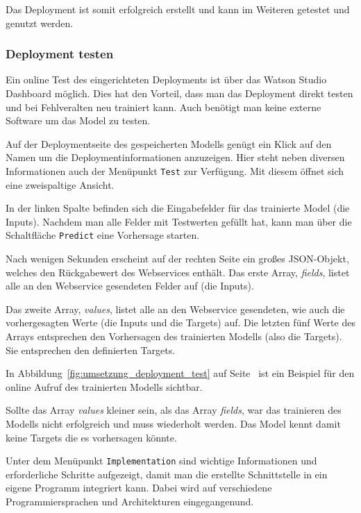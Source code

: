 Das Deployment ist somit erfolgreich erstellt und kann im Weiteren getestet und genutzt werden.

\subsubsection{Deployment testen}
Ein online Test des eingerichteten Deployments ist über das Watson Studio Dashboard möglich. Dies hat den Vorteil, dass
man das Deployment direkt testen und bei Fehlveralten neu trainiert kann. Auch benötigt man keine externe Software um
das Model zu testen.

Auf der Deploymentseite des gespeicherten Modells genügt ein Klick auf den Namen um die Deploymentinformationen anzuzeigen.
Hier steht neben diversen Informationen auch der Menüpunkt \texttt{Test} zur Verfügung. Mit diesem öffnet sich eine
zweispaltige Ansicht.

In der linken Spalte befinden sich die Eingabefelder für das trainierte Model (die Inputs). Nachdem man alle Felder mit
Testwerten gefüllt hat, kann man über die Schaltfläche \texttt{Predict} eine Vorhersage starten.

Nach wenigen Sekunden erscheint auf der rechten Seite ein großes JSON-Objekt, welches den Rückgabewert des Webservices
enthält. Das erste Array, \textit{fields}, listet alle an den Webservice gesendeten Felder auf (die Inputs).

Das zweite Array, \textit{values}, listet alle an den Webservice gesendeten, wie auch die vorhergesagten Werte (die
Inputs und die Targets) auf. Die letzten fünf Werte des Arrays entsprechen den Vorhersagen des trainierten Modells (also
die Targets). Sie entsprechen den definierten Targets.

In Abbildung~\ref{fig:umsetzung_deployment_test} auf Seite~\pageref{fig:umsetzung_deployment_test} ist ein Beispiel für
den online Aufruf des trainierten Modells sichtbar.

Sollte das Array \textit{values} kleiner sein, als das Array \textit{fields}, war das trainieren des Modells nicht
erfolgreich und muss wiederholt werden. Das Model kennt damit keine Targets die es vorhersagen könnte.

Unter dem Menüpunkt \texttt{Implementation} sind wichtige Informationen und erforderliche Schritte aufgezeigt, damit
man die erstellte Schnittstelle in ein eigene Programm integriert kann. Dabei wird auf verschiedene Programmiersprachen
und Architekturen eingegangenund.

